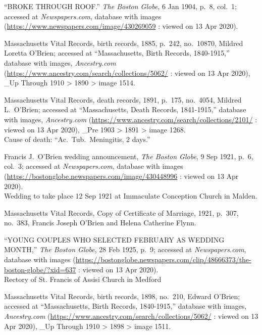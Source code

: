 \begin{thebibliography}{999}
	``BROKE THROUGH ROOF.'' \textit{The Boston Globe}, 6 Jan 1904, p.\ 8, col.\ 1; accessed at \textit{Newspapers.com}, database with images (\url{https://www.newspapers.com/image/430269059} : viewed on 13 Apr 2020).
	
	Massachusetts Vital Records, birth records, 1885, p.\ 242, no.\ 10870, Mildred Loretta O'Brien; accessed at ``Massachusetts, Birth Records, 1840-1915,'' database with images, \textit{Ancestry.com} (\url{https://www.ancestry.com/search/collections/5062/} : viewed on 13 Apr 2020), \_Up Through 1910 > 1890 > image 1514.
	
	Massachusetts Vital Records, death records, 1891, p.\ 175, no.\ 4054, Mildred L.\ O'Brien; accessed at ``Massachusetts, Death Records, 1841-1915,'' database with images, \textit{Ancestry.com} (\url{https://www.ancestry.com/search/collections/2101/} : viewed on 13 Apr 2020), \_Pre 1903 > 1891 > image 1268.\\
	Cause of death: ``Ac.\ Tub.\ Meningitis, 2 days.''
	
	Francis J.\ O'Brien wedding announcement, \textit{The Boston Globe}, 9 Sep 1921, p.\ 6, col.\ 3; accessed at \textit{Newspapers.com}, database with images (\url{https://bostonglobe.newspapers.com/image/430448996} : viewed on 13 Apr 2020).\\
	Wedding to take place 12 Sep 1921 at Immaculate Conception Church in Malden.
	
	Massachusetts Vital Records, Copy of Certificate of Marriage, 1921, p.\ 307, no.\ 383, Francis Joseph O'Brien and Helena Catherine Flynn.
	
	``YOUNG COUPLES WHO SELECTED FEBRUARY AS WEDDING MONTH,'' \textit{The Boston Globe}, 28 Feb 1925, p.\ 9; accessed at \textit{Newspapers.com}, database with images (\url{https://bostonglobe.newspapers.com/clip/48666373/the-boston-globe/?xid=637} : viewed on 13 Apr 2020).\\
	Rectory of St. Francis of Assisi Church in Medford
	
	Massachusetts Vital Records, birth records, 1898, no.\ 210, Edward O'Brien; accessed at ``Massachusetts, Birth Records, 1840-1915,'' database with images, \textit{Ancestry.com} (\url{https://www.ancestry.com/search/collections/5062/} : viewed on 13 Apr 2020), \_Up Through 1910 > 1898 > image 1511.
	

\end{thebibliography}
